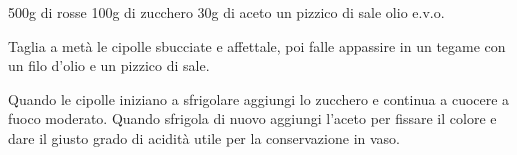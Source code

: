 \begin{ingreds}
	500g di  rosse
	100g di zucchero
	30g di aceto
	un pizzico di sale
	olio e.v.o.

\end{ingreds}

\begin{method}
Taglia a metà le cipolle sbucciate e affettale, poi falle appassire in un tegame con un filo d'olio e un pizzico di sale.

Quando le cipolle iniziano a sfrigolare aggiungi lo zucchero e continua a cuocere a fuoco moderato. Quando sfrigola di nuovo aggiungi l'aceto per fissare il colore e dare il giusto grado di acidità utile per la conservazione in vaso.



\end{method}



